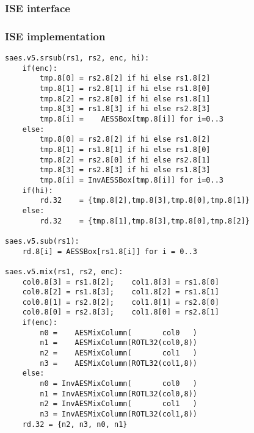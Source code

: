 
\subsubsection{ISE interface}



\subsubsection{ISE implementation}

\begin{lstlisting}[language=pseudo,style=block]
saes.v5.srsub(rs1, rs2, enc, hi):
    if(enc):
        tmp.8[0] = rs2.8[2] if hi else rs1.8[2]
        tmp.8[1] = rs2.8[1] if hi else rs1.8[0]
        tmp.8[2] = rs2.8[0] if hi else rs1.8[1]
        tmp.8[3] = rs1.8[3] if hi else rs2.8[3]
        tmp.8[i] =    AESSBox[tmp.8[i]] for i=0..3
    else:
        tmp.8[0] = rs2.8[2] if hi else rs1.8[2]
        tmp.8[1] = rs1.8[1] if hi else rs1.8[0]
        tmp.8[2] = rs2.8[0] if hi else rs2.8[1]
        tmp.8[3] = rs2.8[3] if hi else rs1.8[3]
        tmp.8[i] = InvAESSBox[tmp.8[i]] for i=0..3
    if(hi):
        rd.32    = {tmp.8[2],tmp.8[3],tmp.8[0],tmp.8[1]}
    else:
        rd.32    = {tmp.8[1],tmp.8[3],tmp.8[0],tmp.8[2]}

saes.v5.sub(rs1):
    rd.8[i] = AESSBox[rs1.8[i]] for i = 0..3

saes.v5.mix(rs1, rs2, enc):
    col0.8[3] = rs1.8[2];    col1.8[3] = rs1.8[0]
    col0.8[2] = rs1.8[3];    col1.8[2] = rs1.8[1]
    col0.8[1] = rs2.8[2];    col1.8[1] = rs2.8[0]
    col0.8[0] = rs2.8[3];    col1.8[0] = rs2.8[1]
    if(enc):
        n0 =    AESMixColumn(       col0   )
        n1 =    AESMixColumn(ROTL32(col0,8))
        n2 =    AESMixColumn(       col1   )
        n3 =    AESMixColumn(ROTL32(col1,8))
    else:
        n0 = InvAESMixColumn(       col0   )
        n1 = InvAESMixColumn(ROTL32(col0,8))
        n2 = InvAESMixColumn(       col1   )
        n3 = InvAESMixColumn(ROTL32(col1,8))
    rd.32 = {n2, n3, n0, n1}
\end{lstlisting}


